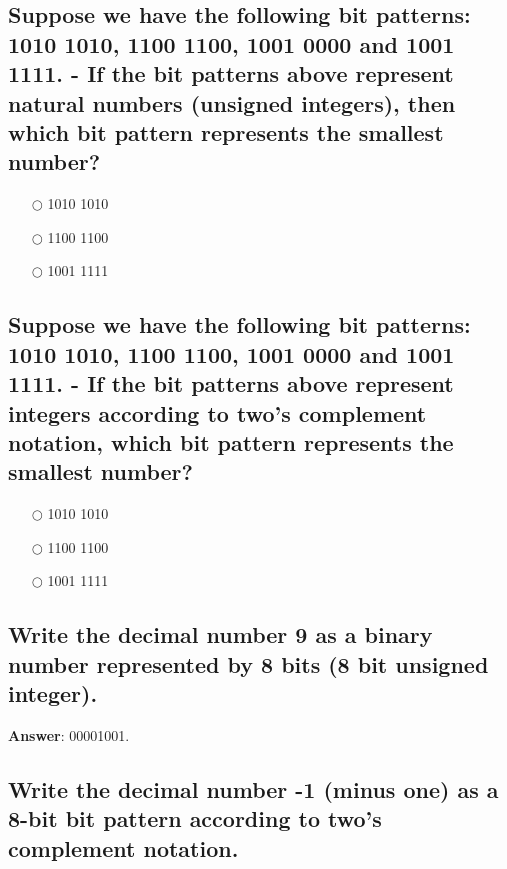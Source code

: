 \documentclass[a4paper,11pt,oneside]{article}
\begin{document}
\begin{sloppypar}
\subsection{Suppose we have the following bit patterns: 1010 1010, 1100 1100, 1001 0000 and 1001 1111. - If the bit patterns above represent natural numbers (unsigned integers), then which bit pattern represents the smallest number?}

\label{q:35500:mc:en:True}

\begin{itemize}
  \item[$\bigcirc$] 1010 1010
  \item[$\bigcirc$] 1100 1100
  \item[$\bigcirc$] 1001 1111
\end{itemize}

\subsection{Suppose we have the following bit patterns: 1010 1010, 1100 1100, 1001 0000 and 1001 1111. - If the bit patterns above represent integers according to two's complement notation, which bit pattern represents the smallest number?}

\label{q:3550001:mc:en:True}

\begin{itemize}
  \item[$\bigcirc$] 1010 1010
  \item[$\bigcirc$] 1100 1100
  \item[$\bigcirc$] 1001 1111
\end{itemize}





\subsection{Write the decimal number 9 as a binary number represented by 8 bits (8 bit unsigned integer).}

\label{q:357:sa:en:True}

\textbf{Answer}: 00001001.



\subsection{Write the decimal number -1 (minus one) as a 8-bit bit pattern according to two{\textquoteright}s complement notation.}


\end{sloppypar}
\end{document}
